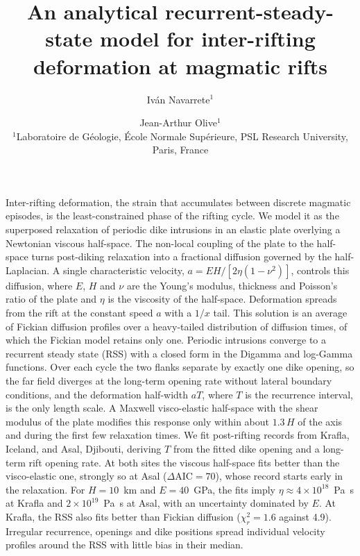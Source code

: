 \documentclass[extra]{gji}
\title[Navarrete \& Olive -- RSS inter-rifting model]
  {An analytical recurrent-steady-state model for inter-rifting deformation at magmatic rifts}
\author[Navarrete \& Olive]
  {Iv\'an Navarrete$^1$ \and Jean-Arthur Olive$^1$ \\
  $^1$Laboratoire de G\'eologie, \'Ecole Normale Sup\'erieure,
  PSL Research University, Paris, France
  }
\date{}
\begin{document}
\label{firstpage}
\maketitle

\begin{summary}
Inter-rifting deformation, the strain that accumulates between discrete
magmatic episodes, is the least-constrained phase of the rifting cycle. We
model it as the superposed relaxation of periodic dike intrusions in an
elastic plate overlying a Newtonian viscous half-space.
The non-local coupling of the plate to the half-space turns post-diking
relaxation into a fractional diffusion governed by the half-Laplacian. A
single characteristic velocity, $a = EH/[2\eta(1-\nu^2)]$, controls this
diffusion, where $E$,
$H$ and $\nu$ are the Young's modulus, thickness and Poisson's ratio of the
plate and $\eta$ is the viscosity of the half-space. Deformation spreads
from the rift at the constant speed $a$ with a $1/x$ tail. This
solution is an average of Fickian diffusion profiles over a heavy-tailed
distribution of diffusion times, of which the Fickian model retains only
one. Periodic intrusions converge to a recurrent steady state (RSS) with a
closed form in the Digamma and log-Gamma functions. Over each cycle the
two flanks separate by exactly one dike opening, so the far field diverges
at the long-term opening rate without lateral boundary conditions, and the
deformation half-width $aT$, where $T$ is the recurrence interval, is the
only length scale. A Maxwell visco-elastic half-space with the shear
modulus of the plate modifies this response only within about $1.3\,H$ of
the axis and during the first few relaxation times. We fit post-rifting
records from Krafla, Iceland, and Asal, Djibouti, deriving $T$ from the
fitted dike opening and a long-term rift opening rate. At both sites the
viscous half-space fits better than the visco-elastic one, strongly so at
Asal ($\Delta\mathrm{AIC} = 70$), whose record starts early in the
relaxation. For $H = 10$~km and $E = 40$~GPa, the fits imply
$\eta \approx 4\times10^{18}$~Pa~s at Krafla and
$2\times10^{19}$~Pa~s at Asal, with an uncertainty dominated by $E$. At
Krafla, the RSS also fits better than Fickian diffusion ($\chi^2_r = 1.6$
against 4.9). Irregular recurrence, openings and dike positions spread
individual velocity profiles around the RSS with little bias in their
median.
\end{summary}
\end{document}
